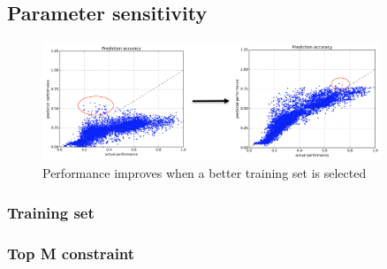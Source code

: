   \subsection{Parameter sensitivity}
  \label{sec:parametersensitivity}
  \begin{figure}[tbhp]
    \centering
    \includegraphics[width=0.9\textwidth]{images/ypei_perf_change.png}
    \caption{Performance improves when a better training set is selected}
    \label{fig:ypei_perf_change}
  \end{figure}

    \subsubsection{Training set}
    \label{sec:training_set}

    \subsubsection{Top M constraint}
    \label{sec:top_m}
